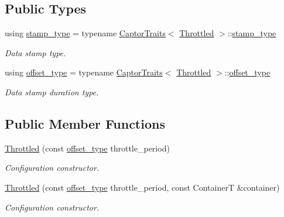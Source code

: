 \subsection*{Public Types}
\begin{DoxyCompactItemize}
\item 
\mbox{\label{classflow_1_1driver_1_1_throttled_aeeea57c4694f5263f6139a377bb7393d}} 
using \hyperlink{classflow_1_1driver_1_1_throttled_aeeea57c4694f5263f6139a377bb7393d}{stamp\+\_\+type} = typename \hyperlink{structflow_1_1_captor_traits}{Captor\+Traits}$<$ \hyperlink{classflow_1_1driver_1_1_throttled}{Throttled} $>$\+::\hyperlink{classflow_1_1driver_1_1_throttled_aeeea57c4694f5263f6139a377bb7393d}{stamp\+\_\+type}
\begin{DoxyCompactList}\small\item\em Data stamp type. \end{DoxyCompactList}\item 
\mbox{\label{classflow_1_1driver_1_1_throttled_a66bc6f61441318d9a42de85e3f24e37d}} 
using \hyperlink{classflow_1_1driver_1_1_throttled_a66bc6f61441318d9a42de85e3f24e37d}{offset\+\_\+type} = typename \hyperlink{structflow_1_1_captor_traits}{Captor\+Traits}$<$ \hyperlink{classflow_1_1driver_1_1_throttled}{Throttled} $>$\+::\hyperlink{classflow_1_1driver_1_1_throttled_a66bc6f61441318d9a42de85e3f24e37d}{offset\+\_\+type}
\begin{DoxyCompactList}\small\item\em Data stamp duration type. \end{DoxyCompactList}\end{DoxyCompactItemize}
\subsection*{Public Member Functions}
\begin{DoxyCompactItemize}
\item 
\hyperlink{classflow_1_1driver_1_1_throttled_a49cd5d051b282ca4145beb4371e94d5d}{Throttled} (const \hyperlink{classflow_1_1driver_1_1_throttled_a66bc6f61441318d9a42de85e3f24e37d}{offset\+\_\+type} throttle\+\_\+period)
\begin{DoxyCompactList}\small\item\em Configuration constructor. \end{DoxyCompactList}\item 
\hyperlink{classflow_1_1driver_1_1_throttled_a9f92edf21a6634946d3a0145b569806c}{Throttled} (const \hyperlink{classflow_1_1driver_1_1_throttled_a66bc6f61441318d9a42de85e3f24e37d}{offset\+\_\+type} throttle\+\_\+period, const ContainerT \&container)
\begin{DoxyCompactList}\small\item\em Configuration constructor. \end{DoxyCompactList}\end{DoxyCompactItemize}
